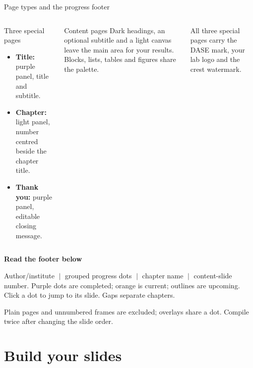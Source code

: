 \documentclass[aspectratio=169,10pt]{beamer}
\begin{document}
\begin{frame}{Page types and the progress footer}
  \begin{columns}[T,onlytextwidth]
      \begin{block}{Three special pages}
        \begin{itemize}
          \item \textbf{Title:} purple panel, title and subtitle.
          \item \textbf{Chapter:} light panel, number centred beside the chapter title.
          \item \textbf{Thank you:} purple panel, editable closing message.
        \end{itemize}
      \end{block}
      \begin{exampleblock}{Content pages}
        Dark headings, an optional subtitle and a light canvas leave the main area for your results. Blocks, lists, tables and figures share the palette.
      \end{exampleblock}
      \small All three special pages carry the DASE mark, your lab logo and the crest watermark.
  \end{columns}
  \medskip
  \textbf{Read the footer below}\par\smallskip
  \small Author/institute $\;\vert\;$ grouped progress dots $\;\vert\;$ chapter name $\;\vert\;$ content-slide number.
  Purple dots are completed; orange is current; outlines are upcoming. Click a dot to jump to its slide. Gaps separate chapters.
  \par\smallskip
  \textcolor{DASEslate}{\scriptsize Plain pages and unnumbered frames are excluded; overlays share a dot. Compile twice after changing the slide order.}
\end{frame}

\section{Build your slides}
\end{document}
